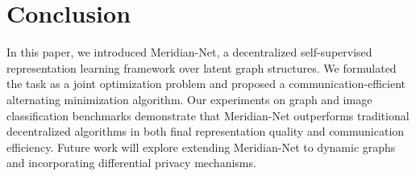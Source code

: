 \section{Conclusion}
In this paper, we introduced Meridian-Net, a decentralized self-supervised representation learning framework over latent graph structures. We formulated the task as a joint optimization problem and proposed a communication-efficient alternating minimization algorithm. Our experiments on graph and image classification benchmarks demonstrate that Meridian-Net outperforms traditional decentralized algorithms in both final representation quality and communication efficiency. Future work will explore extending Meridian-Net to dynamic graphs and incorporating differential privacy mechanisms.



